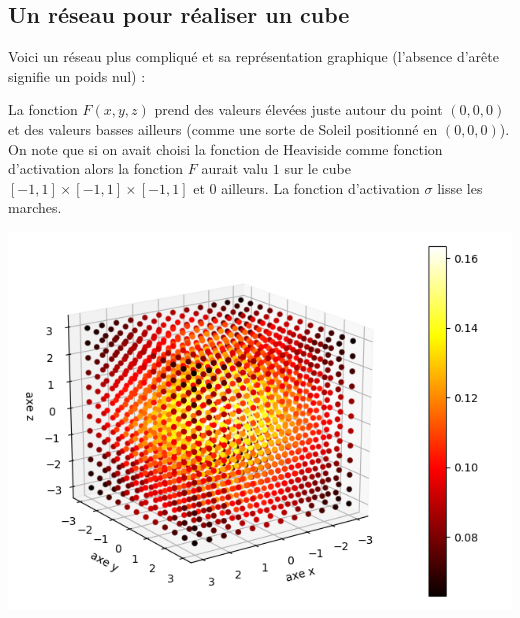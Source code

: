 \documentclass[11pt,class=report,crop=false]{standalone}
\begin{document}
\subsection{Un réseau pour réaliser un cube}



Voici un réseau plus compliqué et sa représentation graphique (l'absence d'arête signifie un poids nul) :


La fonction $F(x,y,z)$ prend des valeurs élevées juste autour du point $(0,0,0)$ et des valeurs basses ailleurs (comme une sorte de Soleil positionné en $(0,0,0)$). On note que si on avait choisi la fonction de Heaviside comme fonction d'activation alors la fonction $F$ aurait valu $1$ sur le cube $[-1,1]\times [-1,1]\times[-1,1]$ et $0$ ailleurs. La fonction d'activation $\sigma$ \og{}lisse\fg{} les marches.


\begin{center}
\includegraphics[scale=\myscale,scale=0.7]{figures/pythontf-3var-02}
\end{center}
\end{document}

